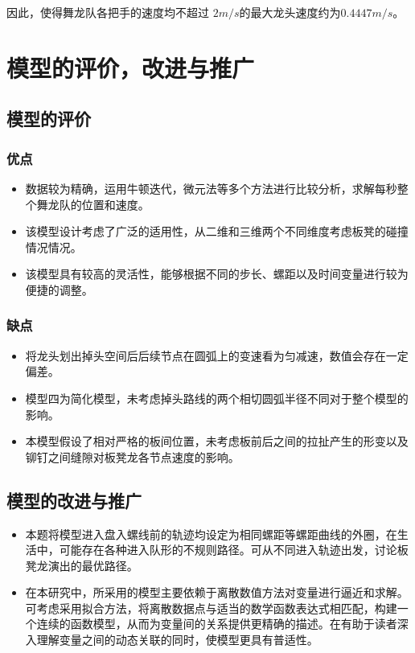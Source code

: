 \documentclass[withoutpreface,bwprint]{cumcmthesis}
\begin{document}
因此，使得舞龙队各把手的速度均不超过 $2m/s$的最大龙头速度约为$0.4447m/s$。
\section{模型的评价，改进与推广}
\subsection{模型的评价}
\subsubsection{优点}
\begin{itemize}
	\item 数据较为精确，运用牛顿迭代，微元法等多个方法进行比较分析，求解每秒整个舞龙队的位置和速度。
	\item 该模型设计考虑了广泛的适用性，从二维和三维两个不同维度考虑板凳的碰撞情况情况。
	\item 该模型具有较高的灵活性，能够根据不同的步长、螺距以及时间变量进行较为便捷的调整。
\end{itemize}
\subsubsection{缺点}
\begin{itemize}
	\item 将龙头划出掉头空间后后续节点在圆弧上的变速看为匀减速，数值会存在一定偏差。
	\item 模型四为简化模型，未考虑掉头路线的两个相切圆弧半径不同对于整个模型的影响。
	\item 本模型假设了相对严格的板间位置，未考虑板前后之间的拉扯产生的形变以及铆钉之间缝隙对板凳龙各节点速度的影响。
\end{itemize}
\subsection{模型的改进与推广}
\begin{itemize}
	\item 本题将模型进入盘入螺线前的轨迹均设定为相同螺距等螺距曲线的外圈，在生活中，可能存在各种进入队形的不规则路径。可从不同进入轨迹出发，讨论板凳龙演出的最优路径。
	\item 在本研究中，所采用的模型主要依赖于离散数值方法对变量进行逼近和求解。可考虑采用拟合方法，将离散数据点与适当的数学函数表达式相匹配，构建一个连续的函数模型，从而为变量间的关系提供更精确的描述。在有助于读者深入理解变量之间的动态关联的同时，使模型更具有普适性。
	\end{itemize}
\end{document}
